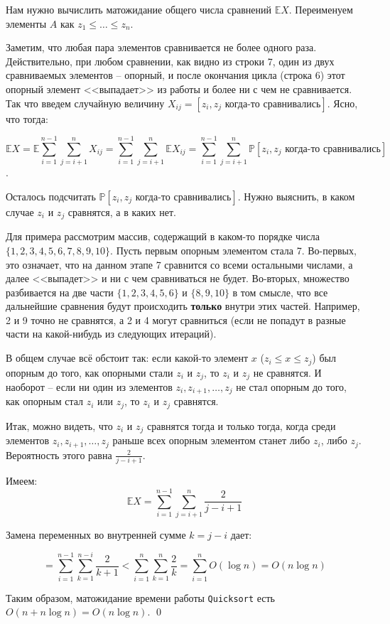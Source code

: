 Нам нужно вычислить матожидание общего числа сравнений $\mathbb E X$. Переименуем элементы $A$ как $z_1 \leq \ldots \leq z_n$.

Заметим, что любая пара элементов сравнивается не более одного раза. Действительно, при любом сравнении, как видно из строки 7, один из двух сравниваемых элементов -- опорный, и после окончания цикла (строка 6) этот опорный элемент <<выпадает>> из работы и более ни с чем не сравнивается. Так что введем случайную величину $X_{ij} = [z_i, z_j \text{ когда-то сравнивались}]$. Ясно, что тогда:

$$\mathbb E X = \mathbb E \sum_{i=1}^{n-1} \sum_{j=i+1}^n X_{ij} = \sum_{i=1}^{n-1} \sum_{j=i+1}^n \mathbb E X_{ij} = \sum_{i=1}^{n-1} \sum_{j=i+1}^n \mathbb P[z_i, z_j \text{ когда-то сравнивались}]$$.

Осталось подсчитать $\mathbb P[z_i, z_j\text{ когда-то сравнивались}]$. Нужно выяснить, в каком случае $z_i$ и $z_j$ сравнятся, а в каких нет.

Для примера рассмотрим массив, содержащий в каком-то порядке числа $\{1,2,3,4,5,6,7,8,9,10\}$. Пусть первым опорным элементом стала 7. Во-первых, это означает, что на данном этапе 7 сравнится со всеми остальными числами, а далее <<выпадет>> и ни с чем сравниваться не будет. Во-вторых, множество разбивается на две части $\{1,2,3,4,5,6\}$ и $\{8,9,10\}$ в том смысле, что все дальнейшие сравнения будут происходить \textbf{только} внутри этих частей. Например, 2 и 9 точно не сравнятся, а 2 и 4 могут сравниться (если не попадут в разные части на какой-нибудь из следующих итераций). 

В общем случае всё обстоит так: если какой-то элемент $x$ ($z_i \leq x \leq z_j$) был опорным до того, как опорными стали $z_i$ и $z_j$, то $z_i$ и $z_j$ не сравнятся. И наоборот -- если ни один из элементов $z_i, z_{i+1},\ldots, z_j$ не стал опорным до того, как опорным стал $z_i$ или $z_j$, то $z_i$ и $z_j$ сравнятся.

Итак, можно видеть, что $z_i$ и $z_j$ сравнятся тогда и только тогда, когда среди элементов $z_i, z_{i+1}, \ldots, z_j$ раньше всех опорным элементом станет либо $z_i$, либо $z_j$. Вероятность этого равна $\frac{2}{j-i+1}$.

Имеем: $$\mathbb E X = \sum_{i=1}^{n-1} \sum_{j=i+1}^n \frac{2}{j-i+1}$$

Замена переменных во внутренней сумме $k = j-i$ дает:

$$ = \sum_{i=1}^{n-1} \sum_{k=1}^{n-i} \frac{2}{k+1} < \sum_{i=1}^n \sum_{k=1}^n \frac{2}{k} = \sum_{i=1}^n O(\log n) = O(n \log n)$$

Таким образом, матожидание времени работы \texttt{Quicksort} есть $O(n+n\log n) = O(n\log n)$. \qed
